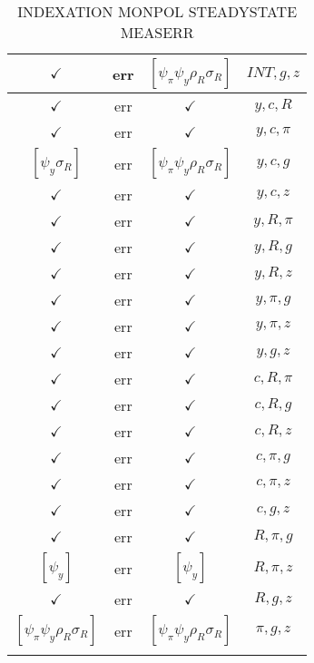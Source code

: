 \documentclass[a4paper,10pt]{article}
\begin{document}
\begin{longtable}{|c|c|c|c|}
$\checkmark$ & err & $[\psi_\pi \psi_y \rho_R \sigma_R ]$ & ${INT},{g},{z}$ \\
\hline
$\checkmark$ & err & $\checkmark$ & ${y},{c},{R}$ \\
\hline
$\checkmark$ & err & $\checkmark$ & ${y},{c},{\pi}$ \\
\hline
$[\psi_y \sigma_R ]$ & err & $[\psi_\pi \psi_y \rho_R \sigma_R ]$ & ${y},{c},{g}$ \\
\hline
$\checkmark$ & err & $\checkmark$ & ${y},{c},{z}$ \\
\hline
$\checkmark$ & err & $\checkmark$ & ${y},{R},{\pi}$ \\
\hline
$\checkmark$ & err & $\checkmark$ & ${y},{R},{g}$ \\
\hline
$\checkmark$ & err & $\checkmark$ & ${y},{R},{z}$ \\
\hline
$\checkmark$ & err & $\checkmark$ & ${y},{\pi},{g}$ \\
\hline
$\checkmark$ & err & $\checkmark$ & ${y},{\pi},{z}$ \\
\hline
$\checkmark$ & err & $\checkmark$ & ${y},{g},{z}$ \\
\hline
$\checkmark$ & err & $\checkmark$ & ${c},{R},{\pi}$ \\
\hline
$\checkmark$ & err & $\checkmark$ & ${c},{R},{g}$ \\
\hline
$\checkmark$ & err & $\checkmark$ & ${c},{R},{z}$ \\
\hline
$\checkmark$ & err & $\checkmark$ & ${c},{\pi},{g}$ \\
\hline
$\checkmark$ & err & $\checkmark$ & ${c},{\pi},{z}$ \\
\hline
$\checkmark$ & err & $\checkmark$ & ${c},{g},{z}$ \\
\hline
$\checkmark$ & err & $\checkmark$ & ${R},{\pi},{g}$ \\
\hline
$[\psi_y ]$ & err & $[\psi_y ]$ & ${R},{\pi},{z}$ \\
\hline
$\checkmark$ & err & $\checkmark$ & ${R},{g},{z}$ \\
\hline
$[\psi_\pi \psi_y \rho_R \sigma_R ]$ & err & $[\psi_\pi \psi_y \rho_R \sigma_R ]$ & ${\pi},{g},{z}$ \\
\hline
\caption{INDEXATION MONPOL STEADYSTATE MEASERR}
\label{table:MyTableLabel}
\end{longtable}
\end{document}

